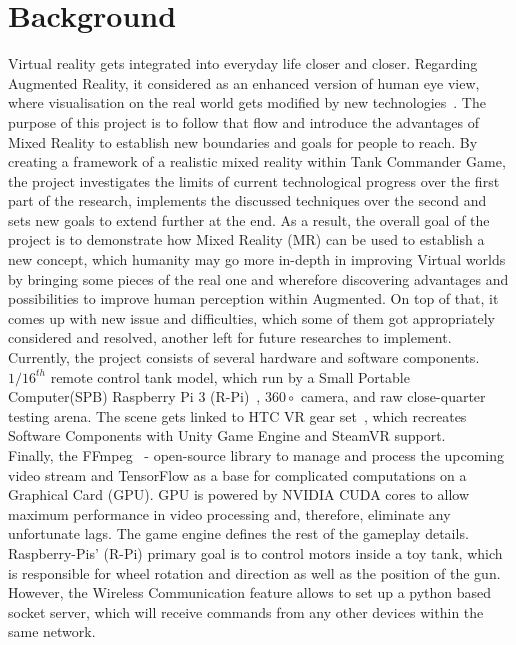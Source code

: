 \chapter{Background}
\vspace{-1pc}
Virtual reality gets integrated into everyday life closer and closer.
Regarding Augmented Reality, it considered as an enhanced version of human eye view, where visualisation on the real world gets modified by new technologies~\cite{reality_tech_what_2018}.
The purpose of this project is to follow that flow and introduce the advantages of Mixed Reality to establish new boundaries and goals for people to reach.
By creating a framework of a realistic mixed reality within Tank Commander Game, the project investigates the limits of current technological progress over the first part of the research, implements the discussed techniques over the second and sets new goals to extend further at the end.
As a result, the overall goal of the project is to demonstrate how Mixed Reality (MR) can be used to establish a new concept, which humanity may go more in-depth in improving Virtual worlds by bringing some pieces of the real one and wherefore discovering advantages and possibilities to improve human perception within Augmented.
On top of that, it comes up with new issue and difficulties, which some of them got appropriately considered and resolved, another left for future researches to implement.\\[1pt]
Currently, the project consists of several hardware and software components. $1/16^{th}$ remote control tank model, which run by a Small Portable Computer(SPB) Raspberry Pi 3 (R-Pi)~\cite{raspberrypi_raspberry_2019}, $360\circ$ camera, and raw close-quarter testing arena.
The scene gets linked to HTC VR gear set~\cite{vive_vive_2019}, which recreates Software Components with Unity Game Engine and SteamVR support. \\
Finally, the FFmpeg~\cite{fate_ffmpeg_2018} - open-source library to manage and process the upcoming video stream and TensorFlow as a base for complicated computations on a Graphical Card (GPU). 
GPU is powered by NVIDIA CUDA cores to allow maximum performance in video processing and, therefore, eliminate any unfortunate lags.
The game engine defines the rest of the gameplay details.
Raspberry-Pis' (R-Pi) primary goal is to control motors inside a toy tank, which is responsible for wheel rotation and direction as well as the position of the gun.
However, the Wireless Communication feature allows to set up a python based socket server, which will receive commands from any other devices within the same network.
